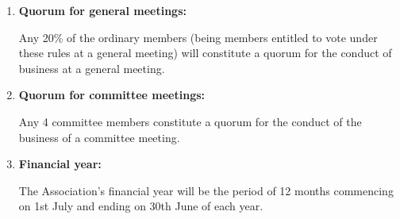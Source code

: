 \documentclass[../constitution.tex]{subfiles}
\begin{document}
\begin{enumerate}[label=\Alph*.]
  \item \textbf{Quorum for general meetings:} \label{key-info-quorum-for-general-meetings}
  
  Any 20\% of the ordinary members (being members entitled to vote under these rules at a general meeting) will constitute a quorum for the conduct of business at a general meeting.

  \item \textbf{Quorum for committee meetings:} \label{key-info-quorum-for-committee-meetings}
  
  Any 4 committee members constitute a quorum for the conduct of the business of a committee meeting.

  \item \textbf{Financial year:} \label{key-info-financial-year}
  
  The Association's financial year will be the period of 12 months commencing on 1st July and ending on 30th June of each year.

\end{enumerate}
\end{document}
